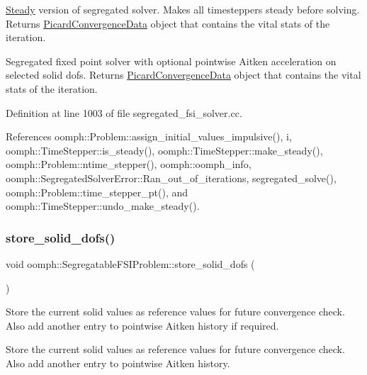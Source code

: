 \hyperlink{classoomph_1_1Steady}{Steady} version of segregated solver. Makes all timesteppers steady before solving. Returns \hyperlink{classoomph_1_1PicardConvergenceData}{Picard\+Convergence\+Data} object that contains the vital stats of the iteration. 

Segregated fixed point solver with optional pointwise Aitken acceleration on selected solid dofs. Returns \hyperlink{classoomph_1_1PicardConvergenceData}{Picard\+Convergence\+Data} object that contains the vital stats of the iteration. 

Definition at line 1003 of file segregated\+\_\+fsi\+\_\+solver.\+cc.



References oomph\+::\+Problem\+::assign\+\_\+initial\+\_\+values\+\_\+impulsive(), i, oomph\+::\+Time\+Stepper\+::is\+\_\+steady(), oomph\+::\+Time\+Stepper\+::make\+\_\+steady(), oomph\+::\+Problem\+::ntime\+\_\+stepper(), oomph\+::oomph\+\_\+info, oomph\+::\+Segregated\+Solver\+Error\+::\+Ran\+\_\+out\+\_\+of\+\_\+iterations, segregated\+\_\+solve(), oomph\+::\+Problem\+::time\+\_\+stepper\+\_\+pt(), and oomph\+::\+Time\+Stepper\+::undo\+\_\+make\+\_\+steady().

\mbox{\label{classoomph_1_1SegregatableFSIProblem_af6a9e7b6f13b86bf86b65cfb7c4f966f}} 
\subsubsection{\texorpdfstring{store\+\_\+solid\+\_\+dofs()}{store\_solid\_dofs()}}
{\footnotesize\ttfamily void oomph\+::\+Segregatable\+F\+S\+I\+Problem\+::store\+\_\+solid\+\_\+dofs (\begin{DoxyParamCaption}{ }\end{DoxyParamCaption})}



Store the current solid values as reference values for future convergence check. Also add another entry to pointwise Aitken history if required. 

Store the current solid values as reference values for future convergence check. Also add another entry to pointwise Aitken history. 

